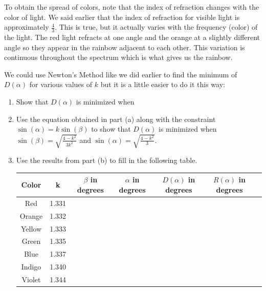 To obtain the spread of colors, note that the index of refraction
changes with the color of light.  We said earlier that the index of
refraction for visible light is approximately $\frac43$. This is true,
but it actually varies with the frequency (color) of the light. The
red light refracts at one angle and the orange at a slightly different
angle so they appear in the rainbow adjacent to each other. This
variation is continuous throughout the spectrum which is what gives us
the rainbow.


\begin{embeddedproblem}
  We could use Newton's Method like we did earlier to find the
  minimum of $D(\alpha)$ for various values of $k$ but it is a
  little easier to do it this way:
     \begin{enumerate}[label={\bf{}(\alph*)}]
  \item Show that $D(\alpha)$ is minimized when %
  \item Use the equation obtained in part (a) along with the
    constraint $\sin(\alpha)=k\sin(\beta)$ to show that $D(\alpha)$
    is minimized when $\sin(\beta)=\sqrt{\frac{4-k^2}{3k^2}}$ and
    $\sin(\alpha)=\sqrt{\frac{4-k^2}{3}}$.  
  \item Use the results from part (b) to fill in the following
    table.
    \begin{table}[h]
      \centering
      \begin{tabular}{|c|c|c|c|c|c|c|} \hline
        Color& k& $\beta$ in degrees&$\alpha$ in degrees&$D(\alpha)$ in degrees&$R(\alpha)$ in degrees\\\hline
        Red & 1.331 & &&&\\\hline
        Orange & 1.332 & &&&\\\hline
        Yellow & 1.333 & &&&\\\hline
        Green & 1.335 & &&&\\\hline
        Blue & 1.337 & &&&\\\hline
        Indigo & 1.340 & &&&\\\hline
        Violet & 1.344 & &&&\\\hline
      \end{tabular}
    \end{table}
  \end{enumerate}
\end{embeddedproblem}

